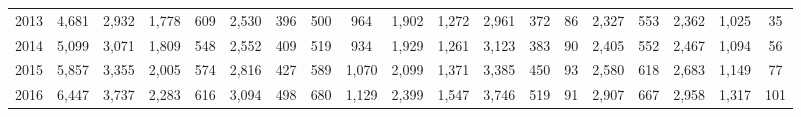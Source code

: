 \begin{table}[htbp]
\begin{tabular}{l*{18}{c}}
2013      &    4,681&    2,932&    1,778&      609&    2,530&      396&      500&      964&    1,902&    1,272&    2,961&      372&       86&    2,327&      553&    2,362&    1,025&       35\\
2014      &    5,099&    3,071&    1,809&      548&    2,552&      409&      519&      934&    1,929&    1,261&    3,123&      383&       90&    2,405&      552&    2,467&    1,094&       56\\
2015      &    5,857&    3,355&    2,005&      574&    2,816&      427&      589&    1,070&    2,099&    1,371&    3,385&      450&       93&    2,580&      618&    2,683&    1,149&       77\\
2016      &    6,447&    3,737&    2,283&      616&    3,094&      498&      680&    1,129&    2,399&    1,547&    3,746&      519&       91&    2,907&      667&    2,958&    1,317&      101\\
\hline\hline
\end{tabular}
\end{table}
